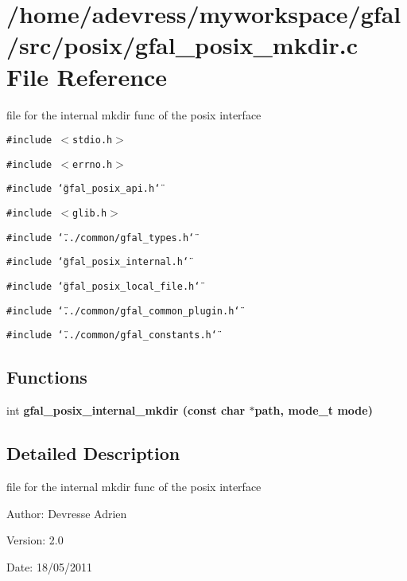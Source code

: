 \section{/home/adevress/myworkspace/gfal/src/posix/gfal\_\-posix\_\-mkdir.c File Reference}
\label{gfal__posix__mkdir_8c}
file for the internal mkdir func of the posix interface 

{\tt \#include $<$stdio.h$>$}\par
{\tt \#include $<$errno.h$>$}\par
{\tt \#include \char`\"{}gfal\_\-posix\_\-api.h\char`\"{}}\par
{\tt \#include $<$glib.h$>$}\par
{\tt \#include \char`\"{}../common/gfal\_\-types.h\char`\"{}}\par
{\tt \#include \char`\"{}gfal\_\-posix\_\-internal.h\char`\"{}}\par
{\tt \#include \char`\"{}gfal\_\-posix\_\-local\_\-file.h\char`\"{}}\par
{\tt \#include \char`\"{}../common/gfal\_\-common\_\-plugin.h\char`\"{}}\par
{\tt \#include \char`\"{}../common/gfal\_\-constants.h\char`\"{}}\par
\subsection*{Functions}
\begin{CompactItemize}
\item 
int \bf{gfal\_\-posix\_\-internal\_\-mkdir} (const char $\ast$path, mode\_\-t mode)
\end{CompactItemize}


\subsection{Detailed Description}
file for the internal mkdir func of the posix interface 

\begin{Desc}
\item[Author:]Devresse Adrien \end{Desc}
\begin{Desc}
\item[Version:]2.0 \end{Desc}
\begin{Desc}
\item[Date:]18/05/2011 \end{Desc}


